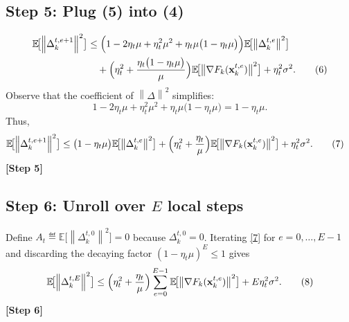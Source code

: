 \documentclass{article}
\newcommand{\E}{\mathbb{E}}
\newcommand{\norm}[1]{\left\lVert #1 \right\rVert}
\begin{document}
\subsection*{Step 5: Plug (5) into (4)}
\begin{align}
\E\!\bigl[\norm{\Delta_{k}^{t,e+1}}^{2}\bigr]
&\le
\Bigl(1-2\eta_t\mu+\eta_t^{2}\mu^{2}
+\eta_t\mu\bigl(1-\eta_t\mu\bigr)\Bigr)\E\!\bigl[\norm{\Delta_{k}^{t,e}}^{2}\bigr]\nonumber\\
&\quad+\Bigl(\eta_t^{2}
+\frac{\eta_t\bigl(1-\eta_t\mu\bigr)}{\mu}\Bigr)
\E\!\bigl[\norm{\nabla F_k(\mathbf{x}_{k}^{t,e})}^{2}\bigr]
+\eta_t^{2}\sigma^{2}.
\tag{6}
\end{align}
Observe that the coefficient of $\norm{\Delta}^{2}$ simplifies:
\[
1-2\eta_t\mu+\eta_t^{2}\mu^{2}
+\eta_t\mu\bigl(1-\eta_t\mu\bigr)
=1-\eta_t\mu.
\]
Thus,
\begin{align}
\E\!\bigl[\norm{\Delta_{k}^{t,e+1}}^{2}\bigr]
&\le
\bigl(1-\eta_t\mu\bigr)\E\!\bigl[\norm{\Delta_{k}^{t,e}}^{2}\bigr]
+\Bigl(\eta_t^{2}
+\frac{\eta_t}{\mu}\Bigr)
\E\!\bigl[\norm{\nabla F_k(\mathbf{x}_{k}^{t,e})}^{2}\bigr]
+\eta_t^{2}\sigma^{2}.
\tag{7}
\end{align}
\noindent\textbf{[Step 5]}

\subsection*{Step 6: Unroll over $E$ local steps}
Define $A_t\eqdef\E\!\bigl[\norm{\Delta_{k}^{t,0}}^{2}\bigr]=0$ because $\Delta_{k}^{t,0}=0$.
Iterating \eqref{7} for $e=0,\dots,E-1$ and discarding the decaying factor $(1-\eta_t\mu)^{E}\le1$ gives
\begin{align}
\E\!\bigl[\norm{\Delta_{k}^{t,E}}^{2}\bigr]
\le
\Bigl(\eta_t^{2}+\frac{\eta_t}{\mu}\Bigr)
\sum_{e=0}^{E-1}
\E\!\bigl[\norm{\nabla F_k(\mathbf{x}_{k}^{t,e})}^{2}\bigr]
+E\eta_t^{2}\sigma^{2}.
\tag{8}
\end{align}
\noindent\textbf{[Step 6]}
\end{document}

